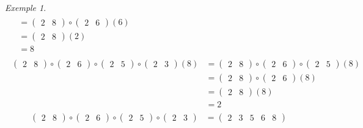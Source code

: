 \documentclass{report}
\theoremstyle{definition}
\theoremstyle{remark}
\newtheorem*{exem}{Exemple}
\begin{document}
\begin{exem}
\begin{align*}
\begin{split}
				&= \begin{pmatrix}
					2&8
				\end{pmatrix} \circ \begin{pmatrix}
					2&6
				\end{pmatrix}(6)\\
				&= \begin{pmatrix}
					2&8
				\end{pmatrix}(2)\\
				&= 8
			\end{split}\tag{6}
			\\[8pt]
			\begin{split}
				\begin{pmatrix}
					2&8
				\end{pmatrix} \circ \begin{pmatrix}
					2&6
				\end{pmatrix} \circ \begin{pmatrix}
					2&5
				\end{pmatrix} \circ \begin{pmatrix}
					2&3
				\end{pmatrix}(8)&= \begin{pmatrix}
					2&8
				\end{pmatrix} \circ \begin{pmatrix}
					2&6
				\end{pmatrix} \circ \begin{pmatrix}
					2&5
				\end{pmatrix}(8)\\
				&= \begin{pmatrix}
					2&8
				\end{pmatrix} \circ \begin{pmatrix}
					2&6
				\end{pmatrix}(8)\\
				&= \begin{pmatrix}
					2&8
				\end{pmatrix}(8)\\
				&= 2
			\end{split}\tag{8}
		\end{align*}%
		\begin{align*}
		\begin{pmatrix}
			2&8
		\end{pmatrix} \circ \begin{pmatrix}
			2&6
		\end{pmatrix} \circ \begin{pmatrix}
			2&5
		\end{pmatrix} \circ \begin{pmatrix}
			2&3
		\end{pmatrix}&= \begin{pmatrix}
			2&3&5&6&8
		\end{pmatrix}
		\end{align*}


\end{exem}
\end{document}
